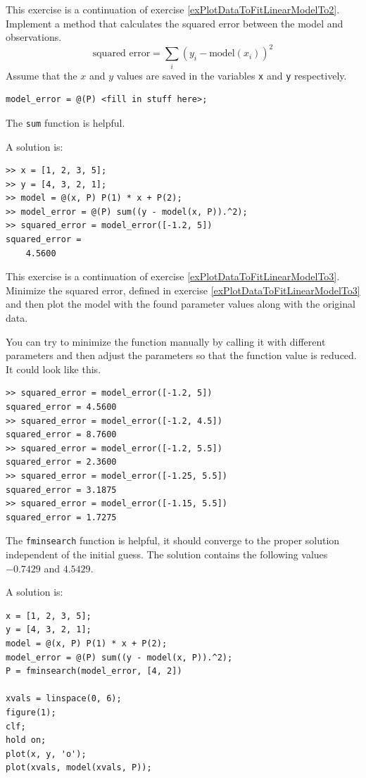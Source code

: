 \begin{ex}
This \label{exPlotDataToFitLinearModelTo3}
exercise is a continuation of exercise \ref{exPlotDataToFitLinearModelTo2}.\\
Implement a method that calculates the squared error
between the model and observations.
\[
\text{squared error} = \sum_i \left(y_i - \text{model}(x_i)\right)^2
\]
Assume that the $x$ and $y$ values are saved in the variables 
\verb!x! and \verb!y! respectively.
\begin{verbatim}
model_error = @(P) <fill in stuff here>;
\end{verbatim}
\begin{hint}
The \verb!sum! function is helpful.
\end{hint}
\begin{sol}
A solution is:
\begin{verbatim}
>> x = [1, 2, 3, 5];
>> y = [4, 3, 2, 1];
>> model = @(x, P) P(1) * x + P(2);
>> model_error = @(P) sum((y - model(x, P)).^2);
>> squared_error = model_error([-1.2, 5])
squared_error =
    4.5600
\end{verbatim}
\end{sol}
\end{ex}

\begin{ex}
This exercise is a continuation of exercise \ref{exPlotDataToFitLinearModelTo3}. \\
Minimize the squared error, defined in exercise \ref{exPlotDataToFitLinearModelTo3} 
and then plot the model with the 
found parameter values along with the original data.
\begin{hint}
You can try to minimize the function manually by calling it with different 
parameters and then adjust the parameters so that the function value
is reduced. It could look like this.
\begin{lstlisting}
>> squared_error = model_error([-1.2, 5])
squared_error = 4.5600
>> squared_error = model_error([-1.2, 4.5])
squared_error = 8.7600
>> squared_error = model_error([-1.2, 5.5])
squared_error = 2.3600
>> squared_error = model_error([-1.25, 5.5])
squared_error = 3.1875
>> squared_error = model_error([-1.15, 5.5])
squared_error = 1.7275
\end{lstlisting}


The \verb!fminsearch! function is helpful, it should converge to 
the proper solution independent of the initial guess.
The solution contains the following values $-0.7429$ and $4.5429$.
\end{hint}
\begin{sol}
A solution is:
\begin{verbatim}
x = [1, 2, 3, 5];
y = [4, 3, 2, 1];
model = @(x, P) P(1) * x + P(2);
model_error = @(P) sum((y - model(x, P)).^2);
P = fminsearch(model_error, [4, 2])

xvals = linspace(0, 6);
figure(1);
clf;
hold on;
plot(x, y, 'o');
plot(xvals, model(xvals, P));
\end{verbatim}
\end{sol}
\end{ex}




